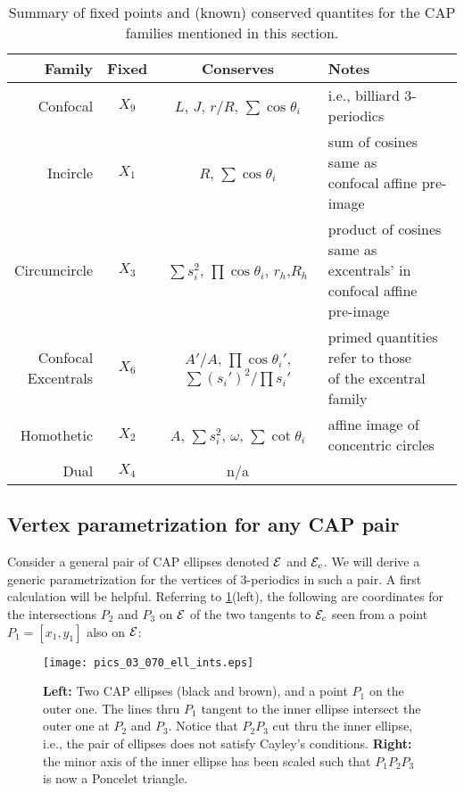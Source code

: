 \begin{table}
\centering
\begin{tabular}{|r|c|c|l|}
\hline
Family & Fixed & Conserves & Notes \\
\hline
Confocal & $X_9$ & $L$, $J$, $r/R$, $\sum\cos\theta_i$ & i.e., billiard 3-periodics \\
\hline
Incircle & $X_1$ & $R$, $\sum\cos\theta_i$ & \makecell[lc]{sum of cosines same as\\confocal affine pre-image} \\
\hline
Circumcircle & $X_3$ & \makecell[cc]{$\sum{s_i^2}$, $\prod\cos\theta_i$,\\$r_h$,$R_h$} & \makecell[lc]{product of cosines same as\\excentrals' in confocal affine\\pre-image} \\
\hline
\makecell[rc]{Confocal\\Excentrals} & $X_6$ & \makecell[cc]{$A'/A$, $\prod\cos\theta_i'$,\\$\sum{(s_i')^2}/\prod{s_i'}$} & \makecell[lc]{primed quantities refer to those\\of the excentral family}  \\
\hline
Homothetic & $X_2$ & $A$, $\sum{s_i^2}$, $\omega$, $\sum\cot\theta_i$ & affine image of concentric circles  \\
\hline
Dual & $X_4$ & n/a &  \\
\hline
\end{tabular}
\caption{Summary of fixed points and (known) conserved quantites for the CAP families mentioned in this section.}
\label{tab:n3-conc-families}
\end{table}

\subsection{Vertex parametrization for any CAP pair}

Consider a general pair of CAP ellipses denoted $\mathcal{E}$ and $\mathcal{E}_c$. We will derive a generic parametrization for the vertices of 3-periodics in such a pair. A first calculation will be helpful. Referring to \cref{fig:ell-ints}(left), the following are coordinates for the intersections $P_2$ and $P_3$ on $\mathcal{E}$ of the two tangents to $\mathcal{E}_c$ seen from a point $P_1=[x_1,y_1]$ also on $\mathcal{E}$:

\begin{figure}
    \centering
    \texttt{[image: pics\_03\_070\_ell\_ints.eps]}
    \caption{\textbf{Left:} Two CAP ellipses (black and brown), and a point $P_1$ on the outer one. The lines thru $P_1$ tangent to the inner ellipse intersect the outer one at $P_2$ and $P_3$. Notice that $P_2 P_3$ cut thru the inner ellipse, i.e., the pair of ellipses does not satisfy Cayley's conditions. \textbf{Right:} the minor axis of the inner ellipse has been scaled such that $P_1 P_2 P_3$ is now a Poncelet triangle.}
    \label{fig:ell-ints}
\end{figure}

